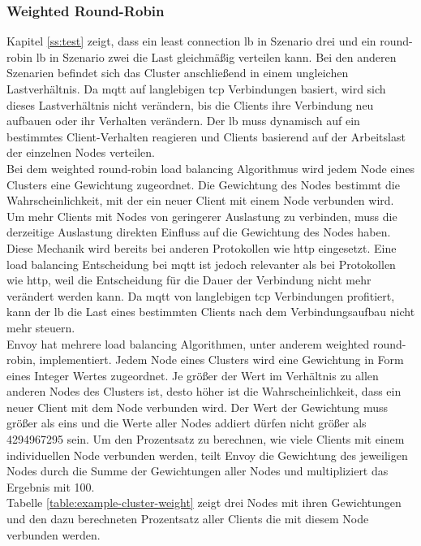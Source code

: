 \subsubsection{Weighted Round-Robin} \label{ss:weighted-rr}
Kapitel \ref{ss:test} zeigt, dass ein least connection \acl{lb} in Szenario drei und ein round-robin \ac{lb} in Szenario zwei die Last gleichmä{\ss}ig verteilen kann.
Bei den anderen Szenarien befindet sich das Cluster anschlie{\ss}end in einem ungleichen Lastverhältnis.
Da \ac{mqtt} auf langlebigen \ac{tcp} Verbindungen basiert, wird sich dieses Lastverhältnis nicht verändern, bis die Clients ihre Verbindung neu aufbauen oder ihr Verhalten verändern.
Der \ac{lb} muss dynamisch auf ein bestimmtes Client-Verhalten reagieren und Clients basierend auf der Arbeitslast der einzelnen Nodes verteilen.
\\
Bei dem weighted round-robin load balancing Algorithmus wird jedem Node eines Clusters eine Gewichtung zugeordnet. Die Gewichtung des Nodes bestimmt die Wahrscheinlichkeit, mit der ein neuer Client mit einem Node verbunden wird.
Um mehr Clients mit Nodes von geringerer Auslastung zu verbinden, muss die derzeitige Auslastung direkten Einfluss auf die Gewichtung des Nodes haben.
Diese Mechanik wird bereits bei anderen Protokollen wie \ac{http} eingesetzt.
Eine load balancing Entscheidung bei \ac{mqtt} ist jedoch relevanter als bei Protokollen wie \ac{http}, weil die Entscheidung für die Dauer der Verbindung nicht mehr verändert werden kann. Da \ac{mqtt} von langlebigen \ac{tcp} Verbindungen profitiert, kann der \ac{lb} die Last eines bestimmten Clients nach dem Verbindungsaufbau nicht mehr steuern.
\\
Envoy hat mehrere load balancing Algorithmen, unter anderem weighted round-robin, implementiert.
Jedem Node eines Clusters wird eine Gewichtung in Form eines Integer Wertes zugeordnet.
Je grö{\ss}er der Wert im Verhältnis zu allen anderen Nodes des Clusters ist, desto höher ist die Wahrscheinlichkeit, dass ein neuer Client mit dem Node verbunden wird. Der Wert der Gewichtung muss grö{\ss}er als eins und die Werte aller Nodes addiert dürfen nicht grö{\ss}er als 4294967295 sein.
Um den Prozentsatz zu berechnen, wie viele Clients mit einem individuellen Node verbunden werden, teilt Envoy die Gewichtung des jeweiligen Nodes durch die Summe der Gewichtungen aller Nodes und multipliziert das Ergebnis mit 100.
\cite{SupportedLoadBalancers}
\\
Tabelle \ref{table:example-cluster-weight} zeigt drei Nodes mit ihren Gewichtungen und den dazu berechneten Prozentsatz aller Clients die mit diesem Node verbunden werden.
